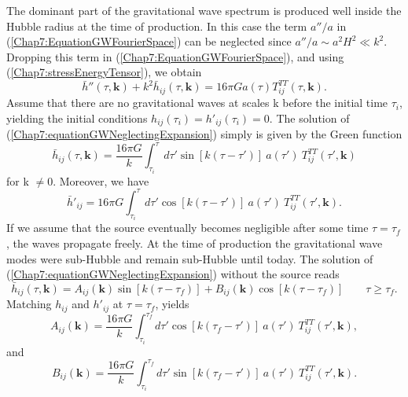 \documentclass[11pt,a4paper,twoside]{book}
\begin{document}
The dominant part of the gravitational wave spectrum is produced well inside the Hubble radius at the time of production. In this case the term $ a''/a $ in (\ref{Chap7:EquationGWFourierSpace}) can be neglected since $ a''/a  \sim a^{2}H^{2} \ll k^{2}$. Dropping this term in (\ref{Chap7:EquationGWFourierSpace}), and using (\ref{Chap7:stressEnergyTensor}), we obtain
\begin{equation}
\label{Chap7:equationGWNeglectingExpansion}
\bar{h}''(\tau,\textbf{k}) + k^{2}\bar{h}_{ij}(\tau,\textbf{k}) = 16\pi G a(\tau) T^{TT}_{ij}(\tau,\textbf{k}).
\end{equation}
Assume that there are no gravitational waves at  scales k before the initial time $\tau_{i}$, yielding the initial conditions $ h_{ij}(\tau_{i})=h'_{ij}(\tau_{i}) =0 $. The solution of (\ref{Chap7:equationGWNeglectingExpansion}) simply is given by the Green function
\begin{equation}
\label{Chap7:solutionhijGreenFunction}
\bar{h}_{ij}(\tau,\textbf{k}) = \frac{16\pi G}{k}\int^{\tau}_{\tau_{i}} d\tau' \sin [k(\tau - \tau')]\  a(\tau')\ T^{TT}_{ij}(\tau',\textbf{k})
\end{equation}
for k $\neq$0. Moreover, we have
\begin{equation}
\label{Chap7:derivativehij}
\bar{h}'_{ij}=16\pi G \int_{\tau_{i}}^{\tau} d\tau'\cos[k(\tau-\tau')]\ a(\tau')\ T_{ij}^{TT}(\tau', \textbf{k}).
\end{equation}
If we assume that the source eventually becomes negligible after some time $ \tau = \tau_{f} $, the waves propagate freely. At the time of production the gravitational wave modes  were sub-Hubble and remain sub-Hubble until today. The solution of (\ref{Chap7:equationGWNeglectingExpansion}) without the source reads
\begin{equation}
\label{Chap7:solutionhWithoutSource}
\bar{h}_{ij}(\tau,\textbf{k}) = A_{ij}(\textbf{k})\sin[k(\tau-\tau_{f})] + B_{ij}(\textbf{k})\cos[k(\tau-\tau_{f})]
\qquad
\tau \ge \tau_{f}.
\end{equation}
Matching $ h_{ij} $ and $ h'_{ij} $ at $ \tau=\tau_{f} $, yields
\begin{equation}
\label{Chap7:ExpressionA}
A_{ij}(\textbf{k}) = \frac{16\pi G}{k}\int_{\tau_{i}}^{\tau_{f}} d\tau'\cos[k(\tau_{f}-\tau')]\ a(\tau')\ T_{ij}^{TT}(\tau', \textbf{k}),
\end{equation}
and
\begin{equation}
	\label{Chap7:ExpressionB}
	B_{ij}(\textbf{k}) = \frac{16\pi G}{k}\int_{\tau_{i}}^{\tau_{f}} d\tau'\sin[k(\tau_{f}-\tau')]\ a(\tau')\ T_{ij}^{TT}(\tau', \textbf{k}).
\end{equation}
\end{document}
